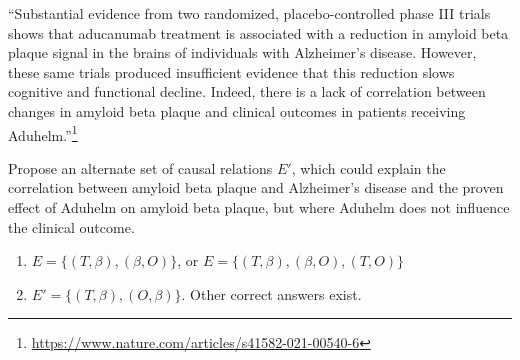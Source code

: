 \begin{enumerate}
\begin{enumerate}
        ``Substantial evidence from two randomized, placebo-controlled phase III trials shows that aducanumab treatment is associated with a reduction in amyloid beta plaque signal in the brains of individuals with Alzheimer's disease. However, these same trials produced insufficient evidence that this reduction slows cognitive and functional decline. Indeed, there is a lack of correlation between changes in amyloid beta plaque and clinical outcomes in patients receiving Aduhelm.''\footnote{\url{https://www.nature.com/articles/s41582-021-00540-6}}

        Propose an alternate set of causal relations $E'$, which could explain the correlation between amyloid beta plaque and Alzheimer's disease and the proven effect of Aduhelm on amyloid beta plaque, but where Aduhelm does not influence the clinical outcome.
    \end{enumerate}

    \begin{gradedsolution}
        \begin{enumerate}
            \item {} $E = \{(T, \beta), (\beta, O)\}$, or $E = \{(T, \beta), (\beta, O), (T, O)\}$
            \item {} $E' = \{(T, \beta), (O, \beta)\}$. Other correct answers exist.
        \end{enumerate}
    \end{gradedsolution}

\end{enumerate}

